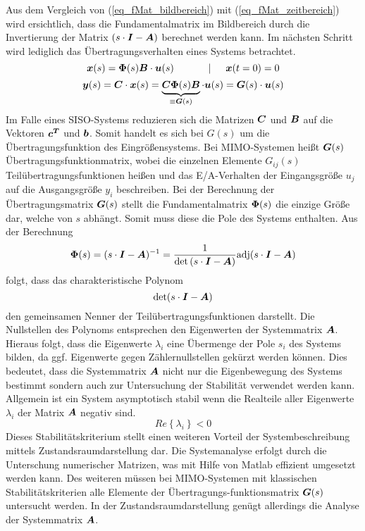 Aus dem Vergleich von (\ref{eq_fMat_bildbereich}) mit (\ref{eq_fMat_zeitbereich}) wird ersichtlich, dass die Fundamentalmatrix im Bildbereich durch die Invertierung der Matrix $\left(s\cdot \boldsymbol{I}-\boldsymbol{A}\right)$ berechnet werden kann. Im nächsten Schritt wird lediglich das Übertragungsverhalten eines Systems betrachtet.
\begin{equation}
\boldsymbol{x}(s) = \boldsymbol{\Phi}(s)\boldsymbol{B}\cdot \boldsymbol{u}(s) \hspace{35pt} \vert \hspace{15pt} \boldsymbol{x}(t=0) = 0
\end{equation}
\begin{equation}
\boldsymbol{y}(s) = \boldsymbol{C}\cdot \boldsymbol{x}(s) = \underbrace{\boldsymbol{C}\boldsymbol{\Phi}(s)\boldsymbol{B}}_{\equiv \boldsymbol{G}(s)}\cdot \boldsymbol{u}(s) = \boldsymbol{G}(s)\cdot \boldsymbol{u}(s)
\end{equation}
Im Falle eines SISO-Systems reduzieren sich die Matrizen $\boldsymbol{C}$ und $\boldsymbol{B}$ auf die Vektoren $\boldsymbol{c^T}$ und $\boldsymbol{b}$. Somit handelt es sich bei $G(s)$ um die Übertragungsfunktion des Eingrößensystems. Bei MIMO-Systemen heißt $\boldsymbol{G}(s)$ Übertragungsfunktionmatrix, wobei die einzelnen Elemente $G_{ij}(s)$ Teilübertragungsfunktionen heißen und das E/A-Verhalten der Eingangsgröße $u_j$ auf die Ausgangsgröße $y_i$ beschreiben. Bei der Berechnung der Übertragungsmatrix $\boldsymbol{G}(s)$ stellt die Fundamentalmatrix $\boldsymbol{\Phi}(s)$ die einzige Größe dar, welche von $s$ abhängt. Somit muss diese die Pole des Systems enthalten. Aus der Berechnung
\begin{equation}
\boldsymbol{\Phi}(s) = (s\cdot \boldsymbol{I}-\boldsymbol{A})^{-1} = \frac{1}{\text{det}\left(s\cdot \boldsymbol{I}  - \boldsymbol{A}\right)}\text{adj}(s\cdot \boldsymbol{I} - \boldsymbol{A})
\end{equation}
folgt, dass das charakteristische Polynom
\begin{equation}
\text{det}(s\cdot \boldsymbol{I}-\boldsymbol{A})
\end{equation}
den gemeinsamen Nenner der Teilübertragungsfunktionen darstellt. Die Nullstellen des Polynoms entsprechen den Eigenwerten der Systemmatrix $\boldsymbol{A}$. Hieraus folgt, dass die Eigenwerte $\lambda_i$ eine Übermenge der Pole $s_i$ des Systems bilden, da ggf. Eigenwerte gegen  Zählernullstellen gekürzt werden können.
Dies bedeutet, dass die Systemmatrix $\boldsymbol{A}$ nicht nur die Eigenbewegung des Systems bestimmt sondern auch zur Untersuchung der Stabilität verwendet werden kann. Allgemein ist ein System asymptotisch stabil wenn die Realteile aller Eigenwerte $\lambda_i$ der Matrix $\boldsymbol{A}$ negativ sind.
\begin{equation}
Re\left\{\lambda_i\right\} < 0
\end{equation}
Dieses Stabilitätskriterium stellt einen weiteren Vorteil der Systembeschreibung mittels Zustandsraumdarstellung dar. Die Systemanalyse erfolgt durch die Unterschung numerischer Matrizen, was mit Hilfe von Matlab effizient umgesetzt werden kann. Des weiteren müssen bei MIMO-Systemen mit klassischen Stabilitätskriterien alle Elemente der Übertragungs-funktionsmatrix $\boldsymbol{G}(s)$ untersucht werden. In der Zustandsraumdarstellung genügt allerdings die Analyse der Systemmatrix $\boldsymbol{A}$.
